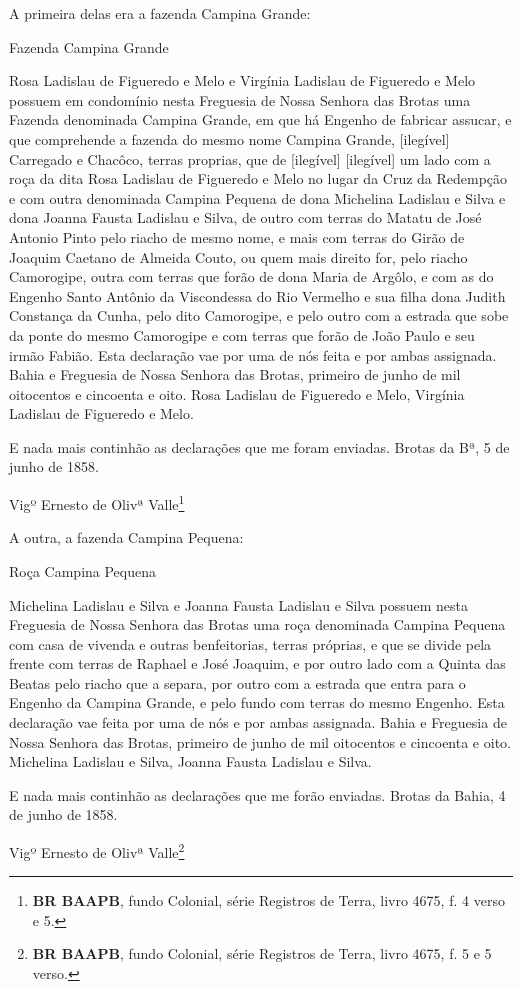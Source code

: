 A primeira delas era a fazenda Campina Grande:

\begin{citacao}
Fazenda Campina Grande

Rosa Ladislau de Figueredo e Melo e Virgínia Ladislau de Figueredo e Melo possuem em condomínio nesta Freguesia de Nossa Senhora das Brotas uma Fazenda denominada Campina Grande, em que há Engenho de fabricar assucar, e que comprehende a fazenda do mesmo nome Campina Grande, [ilegível] Carregado e Chacôco, terras proprias, que de [ilegível] [ilegível] um lado com a roça da dita Rosa Ladislau de Figueredo e Melo no lugar da Cruz da Redempção e com outra denominada Campina Pequena de dona Michelina Ladislau e Silva e dona Joanna Fausta Ladislau e Silva, de outro com terras do Matatu de José Antonio Pinto pelo riacho de mesmo nome, e mais com terras do Girão de Joaquim Caetano de Almeida Couto, ou quem mais direito for, pelo riacho Camorogipe, outra com terras que forão de dona Maria de Argôlo, e com as do Engenho Santo Antônio da Viscondessa do Rio Vermelho e sua filha dona Judith Constança da Cunha, pelo dito Camorogipe, e pelo outro com a estrada que sobe da ponte do mesmo Camorogipe e com terras que forão de João Paulo e seu irmão Fabião. Esta declaração vae por uma de nós feita e por ambas assignada. Bahia e Freguesia de Nossa Senhora das Brotas, primeiro de junho de mil oitocentos e cincoenta e oito. Rosa Ladislau de Figueredo e Melo, Virgínia Ladislau de Figueredo e Melo.

E nada mais continhão as declarações que me foram enviadas. Brotas da Bª, 5 de junho de 1858.

Vigº Ernesto de Olivª Valle\footnote{\textbf{BR BAAPB}, fundo Colonial, série Registros de Terra, livro 4675, f. 4 verso e 5.}
\end{citacao}

A outra, a fazenda Campina Pequena:

\begin{citacao}
Roça Campina Pequena

Michelina Ladislau e Silva e Joanna Fausta Ladislau e Silva possuem nesta Freguesia de Nossa Senhora das Brotas uma roça denominada Campina Pequena com casa de vivenda e outras benfeitorias, terras próprias, e que se divide pela frente com terras de Raphael e José Joaquim, e por outro lado com a Quinta das Beatas pelo riacho que a separa, por outro com a estrada que entra para o Engenho da Campina Grande, e pelo fundo com terras do mesmo Engenho. Esta declaração vae feita por uma de nós e por ambas assignada. Bahia e Freguesia de Nossa Senhora das Brotas, primeiro de junho de mil oitocentos e cincoenta e oito. Michelina Ladislau e Silva, Joanna Fausta Ladislau e Silva.

E nada mais continhão as declarações que me forão enviadas. Brotas da Bahia, 4 de junho de 1858.

Vigº Ernesto de Olivª Valle\footnote{\textbf{BR BAAPB}, fundo Colonial, série Registros de Terra, livro 4675, f. 5 e 5 verso.}
\end{citacao}

